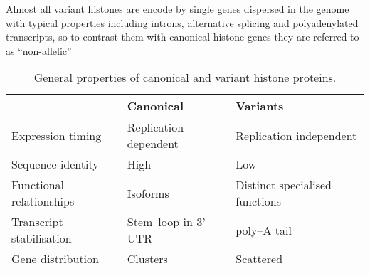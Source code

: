   
  Almost all variant histones are encode by single genes dispersed in the genome 
  with typical properties including introns, alternative splicing and polyadenylated transcripts, 
  so to contrast them with canonical histone genes they are referred to as ``non-allelic''
  



  \begin{table*}
    \caption{General properties of canonical and variant histone proteins.}
    \label{tab:typical-histone-differences}
    \centering
    \begin{tabular}{l l l}
      \toprule
      \null                     & Canonical             & Variants \\
      \midrule
      Expression timing         & Replication dependent & Replication independent \\
      Sequence identity         & High                  & Low \\
      Functional relationships  & Isoforms              & Distinct specialised functions \\
      Transcript stabilisation  & Stem--loop in 3' UTR  & poly--A tail \\
      Gene distribution         & Clusters              & Scattered \\
      \bottomrule
    \end{tabular}
  \end{table*}


